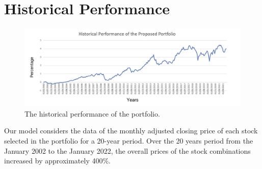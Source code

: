 
\section{Historical Performance}

\begin{figure}[!h]
\centering
\includegraphics[width=1\textwidth]{./Figures/History.png}
\caption{The historical performance of the portfolio.}
\end{figure}

Our model considers the data of the monthly adjusted closing price of each stock selected in the portfolio for a 20-year period. Over the 20 years period from the January 2002 to the January 2022, the overall prices of the stock combinations increased by approximately 400\%.


\newpage